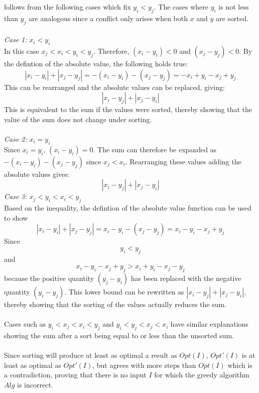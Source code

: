 \documentclass[12pt]{article}
\begin{document}
follows from the following cases which fix $y_i < y_j$.  The cases where
$y_i$ is not less than $y_j$ are analogous since a conflict only arises when both $x$ and $y$
are sorted.\\\\
\textit{Case 1:} $x_i < y_i$\\
In this case $x_j < x_i < y_i < y_j$.  Therefore, $(x_i - y_i) < 0$
and $(x_j - y_j) < 0$.  By the defintion of the absolute value, the following holds
true:
\[
|x_i - y_i| + |x_j - y_j| = -(x_i - y_i) - (x_j - y_j) = -x_i + y_i - x_j + y_j
\]
This can be rearranged and the absolute values can be replaced, giving: 
\[|x_i - y_j| + |x_j - y_i|\]
This is equivalent to the sum if the values were sorted, thereby showing that the value
of the sum does not change under sorting.\\\\
\textit{Case 2:} $x_i = y_i$\\
Since $x_i = y_i$, $(x_i - y_i) = 0$. The sum can therefore be expanded as
$-(x_i - y_i) - (x_j - y_j)$ since $x_j < x_i$.  Rearranging these values
adding the absolute values gives: \[|x_i - y_j| + |x_j - y_i|\] 
\textit{Case 3:} $x_j < y_i < x_i < y_j$\\
Based on the inequality, the defintion of the absolute value function can be used to show
\[
|x_i - y_i| + |x_j - y_j| = x_i - y_i - (x_j - y_j) = x_i - y_i - x_j + y_j
\]
Since 
\[y_i < y_j\] and \[x_i - y_i - x_j + y_j > x_i + y_i - x_j - y_j\] because the positive quantity
$(y_j - y_i)$ has been replaced with the negative quantity $(y_i - y_j)$.  This lower bound
can be rewritten as $|x_i - y_j| + |x_j - y_i|$, thereby showing that the sorting of the
values actually reduces the sum.\\\\
Cases such as $y_i < x_j < x_i < y_j$ and $y_i < y_j < x_j < x_i$ have similar explanations
showing the sum after a sort being equal to or less than the unsorted sum.\\\\
Since sorting will produce at least as optimal a result as $Opt(I)$, $Opt'(I)$ is at least
as optimal as $Opt'(I)$, but agrees with more steps than $Opt(I)$ which is a contradiction,
proving that there is no input $I$ for which the greedy algorithm $Alg$ is incorrect.     
\end{document}
